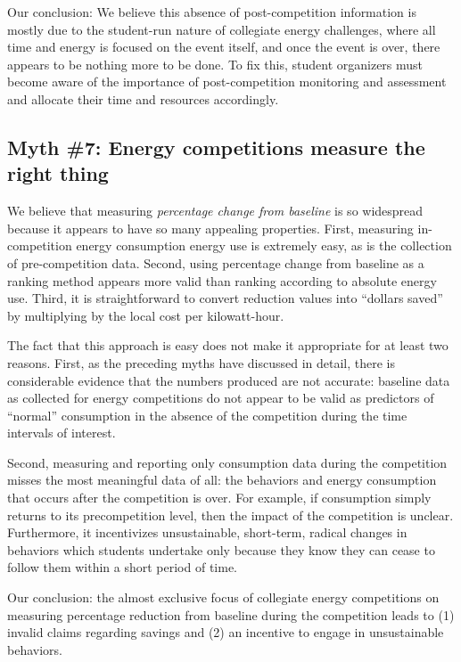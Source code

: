 \documentclass[jou]{apa} %
\begin{document}
Our conclusion: We believe this absence of post-competition information is mostly due to
the student-run nature of collegiate energy challenges, where all time and energy is
focused on the event itself, and once the event is over, there appears to be nothing more
to be done. To fix this, student organizers must become aware of the importance of
post-competition monitoring and assessment and allocate their time and resources
accordingly.

\subsection{Myth \#7: Energy competitions measure the right thing}

We believe that measuring {\em percentage change from baseline} is so widespread because
it appears to have so many appealing properties.  First, measuring in-competition energy
consumption energy use is extremely easy, as is the collection of pre-competition data.
Second, using percentage change from baseline as a ranking method appears more valid than
ranking according to absolute energy use. Third, it is straightforward to convert reduction
values into ``dollars saved'' by multiplying by the local cost per kilowatt-hour.

The fact that this approach is easy does not make it appropriate for at least two
reasons.  First, as the preceding myths have discussed in detail, there is considerable
evidence that the numbers produced are not accurate: baseline data as collected for energy
competitions do not appear to be valid as predictors of ``normal'' consumption in the absence
of the competition during the time intervals of interest.  

Second, measuring and reporting only consumption data during the competition misses the
most meaningful data of all: the behaviors and energy consumption that occurs after the
competition is over. For example, if consumption simply returns to its precompetition
level, then the impact of the competition is unclear. Furthermore, it incentivizes
unsustainable, short-term, radical changes in behaviors which students undertake only
because they know they can cease to follow them within a short period of time.

Our conclusion: the almost exclusive focus of collegiate energy competitions on measuring
percentage reduction from baseline during the competition leads to (1) invalid claims
regarding savings and (2) an incentive to engage in unsustainable behaviors.
\end{document}
